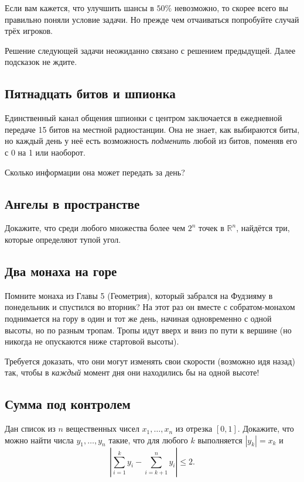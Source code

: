 Если вам кажется, что улучшить шансы в $50\%$ невозможно, то скорее всего вы правильно поняли условие задачи.
Но прежде чем отчаиваться попробуйте случай трёх игроков.

\medskip 

Решение следующей задачи неожиданно связано с решением предыдущей.
Далее подсказок не ждите.

\subsection*{Пятнадцать битов и шпионка}

Единственный канал общения шпионки с центром заключается в ежедневной передаче 15 битов на местной радиостанции.
Она не знает, как выбираются биты, но каждый день у неё есть возможность \emph{подменить} любой из битов, поменяв его с 0 на 1 или наоборот.

Сколько информации она может передать за день?

\subsection*{Ангелы в пространстве}

Докажите, что среди любого множества более чем $2^n$ точек в $\mathbb{R}^n$, найдётся три, которые определяют тупой угол.

\subsection*{Два монаха на горе}

Помните монаха из Главы 5 (Геометрия), который забрался на Фудзияму в понедельник и спустился во вторник?
На этот раз он вместе с собратом-монахом поднимается на гору в один и тот же день, начиная одновременно с одной высоты, но по разным тропам.
Тропы идут вверх и вниз по пути к вершине (но никогда не опускаются ниже стартовой высоты).

Требуется доказать, что они могут изменять свои скорости (возможно идя назад) так, чтобы в \emph{каждый} момент дня они находились бы на одной высоте!

\subsection*{Сумма под контролем}

Дан список из $n$ вещественных чисел $x_1,\dots,x_n$ из отрезка $[0,1]$.
Докажите, что можно найти числа $y_1,\dots,y_n$ такие, что для любого $k$ выполняется $|y_k|=x_k$ и
\[\left|\sum_{i=1}^ky_i-\sum_{i=k+1}^ny_i\right|\le 2.\]

